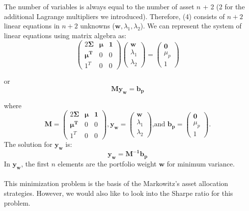 \documentclass[12pt,titlepage,a4paper]{article}
\begin{document}
The number of variables is always equal to the number of asset $n$ + 2 (2 for the additional Lagrange multipliers we introduced). Therefore, (4) consists of $n+2$ linear equations in $n+2$ unknowns ($\mathbf{w}, \lambda_1, \lambda_2$). We can represent the system of linear equations using matrix algebra as: 
\begin{equation*}
\begin{pmatrix} 2\mathbf{\Sigma} & \mathbf{\mu} & \mathbf{1} \\ \mathbf{\mu^T} & 0 & 0 \\ 1^T & 0 & 0 \end{pmatrix} 
\begin{pmatrix}
\mathbf{w} \\ \lambda_1 \\ \lambda_2
\end{pmatrix}
 = 
\begin{pmatrix}
\mathbf{0} \\ \mu_p \\ 1
\end{pmatrix}
\end{equation*}

or 
$$
\mathbf{My_w} = \mathbf{b_p}
$$

where
\begin{equation*}
\mathbf{M} = \begin{pmatrix} 2\mathbf{\Sigma} & \mathbf{\mu} & \mathbf{1} \\ \mathbf{\mu^T} & 0 & 0 \\ 1^T & 0 & 0 \end{pmatrix}, 
\mathbf{y_w}=\begin{pmatrix}
\mathbf{w} \\ \lambda_1 \\ \lambda_2
\end{pmatrix} \text{,and }
\mathbf{b_p} = \begin{pmatrix}
\mathbf{0} \\ \mu_p \\ 1
\end{pmatrix}.
\end{equation*}
The solution for $\mathbf{y_w}$ is: 
\begin{equation}
\mathbf{y_w} = \mathbf{M^{-1}b_p}
\end{equation}
In $\mathbf{y_w}$, the first $n$ elements are the portfolio weight $\mathbf{w}$ for minimum variance. \\ \\
This minimization problem is the basis of the Markowitz's asset allocation strategies. However, we would also like to look into the Sharpe ratio for this problem. \\
\end{document}
